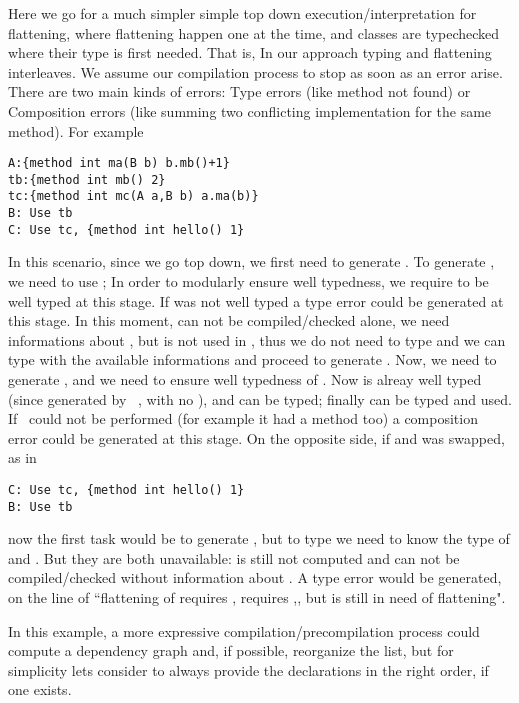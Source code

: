Here we go for a much simpler simple top down execution/interpretation for flattening, where flattening
happen one at the time, and classes are typechecked where their type is first needed.
That is, In our approach typing and flattening interleaves. We assume our compilation process to stop as soon as 
an error arise. There are two main kinds of errors: Type errors (like method not found) or Composition errors (like summing two conflicting implementation for the same method).
For example
\saveSpace\begin{lstlisting}
A:{method int ma(B b) b.mb()+1}
tb:{method int mb() 2}
tc:{method int mc(A a,B b) a.ma(b)}
B: Use tb
C: Use tc, {method int hello() 1}
\end{lstlisting}\saveSpace
In this scenario, since we go top down, we first need to generate \Q@B@.
To generate \Q@B@, we need to use \Q@tb@;
In order to modularly ensure well typedness,
we require \Q@tb@ to be well typed at this stage. If \Q@tb@ was not well typed
a type error could be generated at this stage.
In this moment, \Q@A@ can not be compiled/checked alone,
we need informations about \Q@B@, but \Q@A@ is not used in \Q@tb@,
thus we do not need to type \Q@A@ and we can type \Q@tb@ with
 the available informations and proceed to generate \Q@B@.
Now, we need to generate \Q@C@, and we need to ensure well typedness of \Q@tc@.
Now \Q@B@ is alreay well typed (since generated by \use\ \Q@tb@, with no \mL),
and \Q@A@ can be typed;  finally \Q@tc@ can be typed and used.
If \use\ could not be performed (for example it \Q@tc@ had a method \Q@hello@ too)
a composition error could be generated at this stage.
On the opposite side, if \Q@B@ and \Q@C@ was swapped, as in
\saveSpace\begin{lstlisting}
C: Use tc, {method int hello() 1}  
B: Use tb
\end{lstlisting}\saveSpace
\noindent
now the first task would be to generate \Q@C@, but 
to type \Q@tc@ we need to know the type of \Q@A@ and \Q@B@.
But they are both unavailable: \Q@B@ is still not computed and 
\Q@A@ can not be compiled/checked without information about \Q@B@.
A type error would be generated, on the line of ``flattening of \Q@C@
requires \Q@tc@, \Q@tc@ requires \Q@A@,\Q@B@, but \Q@B@ is still in need of flattening".

In this example, a more expressive compilation/precompilation process 
could compute a dependency graph and, if possible, reorganize the list,
but for simplicity lets consider to always provide the declarations
in the right order, if one exists.

